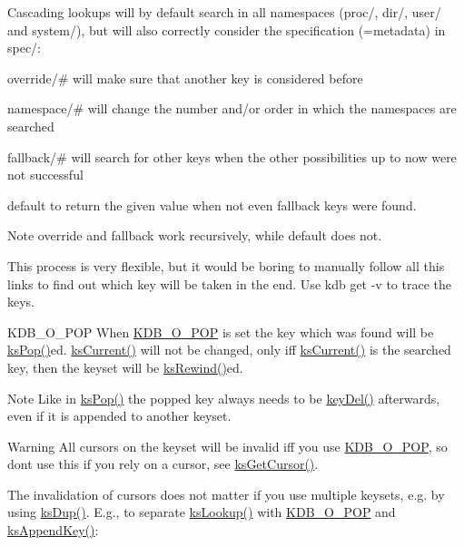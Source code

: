 Cascading lookups will by default search in all namespaces (proc/, dir/, user/ and system/), but will also correctly consider the specification (=metadata) in spec/\+:


\begin{DoxyItemize}
\item {\ttfamily override/\#} will make sure that another key is considered before
\item {\ttfamily namespace/\#} will change the number and/or order in which the namespaces are searched
\item {\ttfamily fallback/\#} will search for other keys when the other possibilities up to now were not successful
\item {\ttfamily default} to return the given value when not even {\ttfamily fallback} keys were found.
\end{DoxyItemize}

\begin{DoxyNote}{Note}
override and fallback work recursively, while default does not.
\end{DoxyNote}
This process is very flexible, but it would be boring to manually follow all this links to find out which key will be taken in the end. Use {\ttfamily kdb get -\/v} to trace the keys.

\begin{DoxyParagraph}{K\+D\+B\+\_\+\+O\+\_\+\+P\+OP}
When \hyperlink{group__keyset_ggada05f4bbf46fde81d0d57df86e73d914a52fb5f2cc86773d393da62bebebf7984}{K\+D\+B\+\_\+\+O\+\_\+\+P\+OP} is set the key which was found will be \hyperlink{group__keyset_gae42530b04defb772059de0600159cf69}{ks\+Pop()}ed. \hyperlink{group__keyset_ga4287b9416912c5f2ab9c195cb74fb094}{ks\+Current()} will not be changed, only iff \hyperlink{group__keyset_ga4287b9416912c5f2ab9c195cb74fb094}{ks\+Current()} is the searched key, then the keyset will be \hyperlink{group__keyset_gabe793ff51f1728e3429c84a8a9086b70}{ks\+Rewind()}ed.
\end{DoxyParagraph}
\begin{DoxyNote}{Note}
Like in \hyperlink{group__keyset_gae42530b04defb772059de0600159cf69}{ks\+Pop()} the popped key always needs to be \hyperlink{group__key_ga3df95bbc2494e3e6703ece5639be5bb1}{key\+Del()} afterwards, even if it is appended to another keyset.
\end{DoxyNote}
\begin{DoxyWarning}{Warning}
All cursors on the keyset will be invalid iff you use \hyperlink{group__keyset_ggada05f4bbf46fde81d0d57df86e73d914a52fb5f2cc86773d393da62bebebf7984}{K\+D\+B\+\_\+\+O\+\_\+\+P\+OP}, so don\textquotesingle{}t use this if you rely on a cursor, see \hyperlink{group__keyset_gace0444eb8ec958a429794f8586fc72e7}{ks\+Get\+Cursor()}.
\end{DoxyWarning}
The invalidation of cursors does not matter if you use multiple keysets, e.\+g. by using \hyperlink{group__keyset_gac59e4b328245463f1451f68d5106151c}{ks\+Dup()}. E.\+g., to separate \hyperlink{group__keyset_ga60f1ddcf23272f2b29b90e92ebe9b56f}{ks\+Lookup()} with \hyperlink{group__keyset_ggada05f4bbf46fde81d0d57df86e73d914a52fb5f2cc86773d393da62bebebf7984}{K\+D\+B\+\_\+\+O\+\_\+\+P\+OP} and \hyperlink{group__keyset_gaa5a1d467a4d71041edce68ea7748ce45}{ks\+Append\+Key()}\+:


